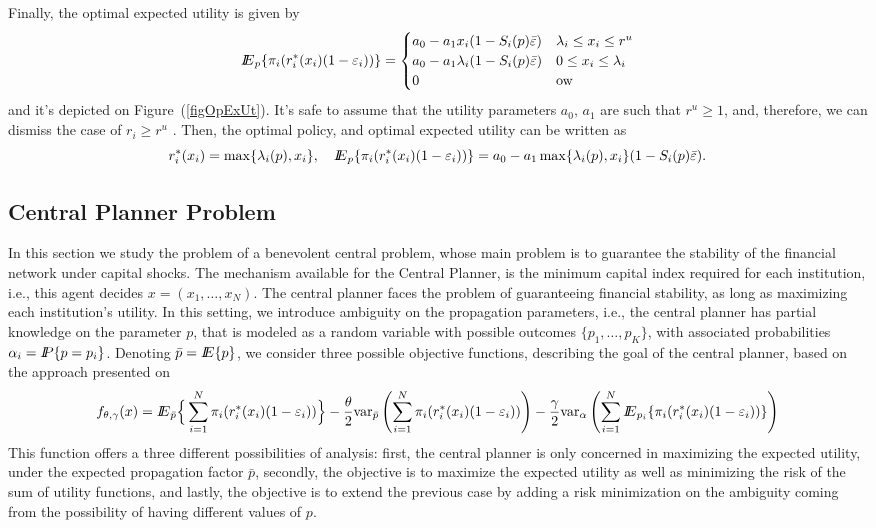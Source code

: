 Finally, the optimal expected utility is given by
\begin{equation}\label{eqEPOpt}
{I\kern-.35em E}_p\{\pi_i(r_i^*(x_i)(1-\varepsilon_i))\}=\begin{cases}
a_0-a_1x_i(1-S_i(p)\bar{\varepsilon})&\lambda_i\leq x_i\leq r^u\\
a_0-a_1\lambda_i(1-S_i(p)\bar{\varepsilon})&0\leq x_i\leq \lambda_i\\
0&{\rm ow}
\end{cases}
\end{equation}
and it's depicted on Figure~(\ref{figOpExUt}).  It's safe to assume that the utility parameters $a_0,\,a_1$ are such that $r^u\geq 1$, and, therefore, we can dismiss the case of $r_i\geq r^u$ .  Then, the optimal policy, and optimal expected utility can be written as
\[r_i^*(x_i)=\max\{\lambda_i(p),x_i\},\quad {I\kern-.35em E}_p\{\pi_i(r_i^*(x_i)(1-\varepsilon_i))\}=a_0-a_1\max\{\lambda_i(p),x_i\}(1-S_i(p)\bar{\varepsilon}).\]


\subsection{Central Planner  Problem}
In this section we study the problem of a benevolent  central problem, whose main problem is to guarantee the stability of the financial network under capital shocks. The mechanism available for the Central Planner, is the minimum capital index required for each institution, i.e., this agent decides $x=(x_1,\ldots,x_N)$.  The central planner faces the problem of guaranteeing financial stability, as long as maximizing each institution's utility.  In this setting, we introduce ambiguity on the propagation parameters, i.e., the central planner has partial knowledge on the parameter $p$, that is modeled as a random variable with possible outcomes $\{p_1,\ldots,p_K\}$, with associated probabilities $\alpha_i={I\kern-.35em P}\{p=p_i\}$.  Denoting $\bar{p}={I\kern-.35em E}\{p\}$, we consider three possible objective functions, describing the goal of the central planner, based on the approach presented on \cite{Mac13alpha}
\begin{equation}\label{objcp}
f_{\theta,\gamma}(x)= {I\kern-.35em E}_{\bar p}\Big\lbrace\sum_{i=1}^N \pi_i(r_i^*(x_i)(1-\varepsilon_i))\Big\rbrace-\frac{\theta}{2}{\mathop{\rm var}\nolimits}_{\bar p}\left(\sum_{i=1}^N\pi_i(r_i^*(x_i)(1-\varepsilon_i))\right)-\frac{\gamma}{2}{\mathop{\rm var}\nolimits}_\alpha\left(\sum_{i=1}^N{I\kern-.35em E}_{p_i}\{\pi_i(r_i^*(x_i)(1-\varepsilon_i))\}\right)
\end{equation}
This function offers a three different possibilities of analysis: first, the central planner is only concerned in maximizing the expected utility, under the expected propagation factor $\bar{p}$, secondly, the objective is to maximize the expected utility as well as minimizing the risk of the sum of utility functions, and lastly, the objective is to extend the previous case by adding a risk minimization on the ambiguity coming from the possibility of having different values of $p$.

